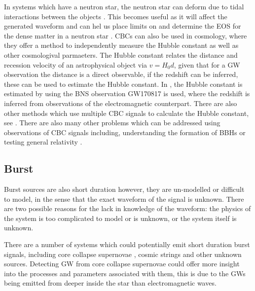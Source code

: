 In systems which have a neutron star, the neutron star can deform due to tidal interactions between the objects
\citep{flanagan2008ConstrainingNeutronstar}.  This becomes useful as it will
affect the generated waveform and can hel us place limits on and determine the
\gls{EOS} for the dense matter in a neutron star
\citep{harry2018ObservingMeasuring}.
\glspl{CBC} can also be used in cosmology, where they offer a method to independently measure the Hubble constant as well as other cosmologival parmaeters.
The Hubble constant relates the distance and recession velocity of an astrophysical object via $v = H_0 d$, given that for a \gls{GW} observation the distance is a direct observable, if the redshift can be inferred, these can be used to estimate the Hubble constant. 
In \cite{theligoscientificcollaborationandthevirgocollaboration2017GravitationalwaveStandard}, the Hubble constant is estimated by using the \gls{BNS} observation GW170817 \citep{abbott2017GW170817Observation} is used, where the redshift is inferred from observations of the electromagnetic counterpart.  There are also other methods which use multiple \gls{CBC} signals to calculate the Hubble constant, see \citep{delpozzo2012InferenceCosmological}.
There are also many other problems which can be addressed using observations of \gls{CBC} signals including, understanding the formation of \glspl{BBH} \citep{zevin2017ConstrainingFormation,mandel2018MergingStellarmass} or testing general relativity \citep{}.  



\subsection{\label{sources:transient:burst}Burst}

Burst sources are also short duration however, they are un-modelled or
difficult to model, in the sense that the exact waveform of the signal is
unknown.  There are two possible reasons for the lack in knowledge of the
waveform: the physics of the system is too complicated to model or is unknown, or the system itself is unknown.  

There are a number of systems which could potentially emit short duration burst signals, including core collapse supernovae \citep{ott2008GravitationalWave}, cosmic strings
\citep{damour2005GravitationalRadiation} and other unknown sources.  Detecting
\gls{GW} from core collapse supernovae could offer more insight into the processes
and parameters associated with them, this is due to the \glspl{GW} being emitted from deeper inside the star than electromagnetic waves.

